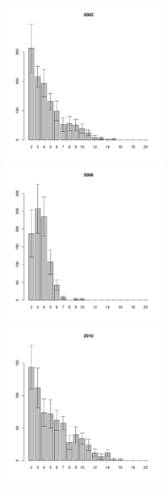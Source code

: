 \begin{figure}[hp]
\begin{minipage}[b]{.3\linewidth}
\begin{center}
	\end{center}
	\end{minipage}
	\begin{minipage}[b]{.3\linewidth}
	\begin{center}
	\includegraphics[width=60mm]{../White_Sea/Ryashkov_YuG/YuG2_2002_.pdf}
	\end{center}
	\end{minipage}
	\hfill	
	\begin{minipage}[b]{.3\linewidth}
	\begin{center}
	\includegraphics[width=60mm]{../White_Sea/Ryashkov_YuG/YuG2_2006_.pdf}
	\end{center}
	\end{minipage}
	\hfill
	\begin{minipage}[b]{.3\linewidth}
	\begin{center}
	\includegraphics[width=60mm]{../White_Sea/Ryashkov_YuG/YuG2_2010_.pdf}

\end{center}
\end{minipage}
\end{figure}
